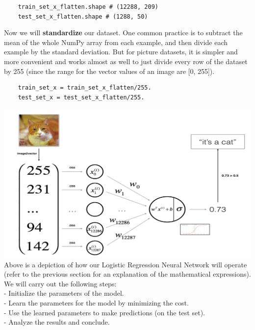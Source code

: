 \documentclass[11pt, a4paper]{article}
\begin{document}
\begin{spacing}{1.1}
\begin{lstlisting}
	train_set_x_flatten.shape # (12288, 209)
	test_set_x_flatten.shape # (1288, 50) \end{lstlisting} \vspace*{1mm} 
	Now we will \textbf{standardize} our dataset. One common practice is to subtract the mean of the whole NumPy array from each example, and then divide each example by the standard deviation. But for picture datasets, it is simpler and more convenient and works almost as well to just divide every row of the dataset by 255 (since the range for the vector values of an image are [0, 255]). 
	\begin{lstlisting}
	train_set_x = train_set_x_flatten/255.
	test_set_x = test_set_x_flatten/255. \end{lstlisting} \vspace*{1mm} 
	\hspace*{16mm} \includegraphics[scale=.5]{cat_log} \\
	Above is a depiction of how our Logistic Regression Neural Network will operate (refer to the previous section for an explanation of the mathematical expressions). We will carry out the following steps: \\
	\hspace*{3mm} - Initialize the parameters of the model. \\
	\hspace*{3mm} - Learn the parameters for the model by minimizing the cost. \\
	\hspace*{3mm} - Use the learned parameters to make predictions (on the test set). \\
	\hspace*{3mm} - Analyze the results and conclude. \vspace*{2mm} \\

\end{spacing}
\end{document}
